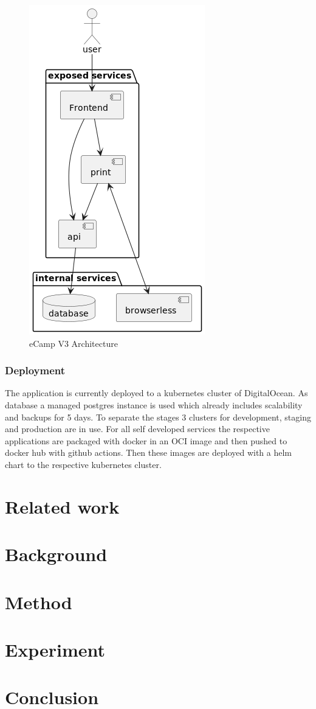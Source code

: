 \documentclass[conference]{IEEEtran}
\begin{document}
\begin{figure}[h!]
	\includegraphics[height=\columnwidth]{sections/assets/ecamp3-architecture}
	\caption{eCamp V3 Architecture}
	\label{fig:ecamp3-architecture}
\end{figure}

\subsubsection{Deployment}

The application is currently deployed to a kubernetes cluster of DigitalOcean.
As database a managed postgres instance is used which already includes scalability and backups for 5 days.
To separate the stages 3 clusters for development, staging and production are in use.
For all self developed services the respective applications are packaged with docker in an OCI image and then
pushed to docker hub with github actions\cite{ecamp3-reusable-build-and-push}.
Then these images are deployed with a helm chart to the respective kubernetes cluster\cite{ecamp3-reusable-dev-deployment, ecamp3-deployment-stage-prod}.

\section{Related work}

\section{Background}

\section{Method}

\section{Experiment}

\section{Conclusion}




\date{\today}



\newpage
%
\end{document}
